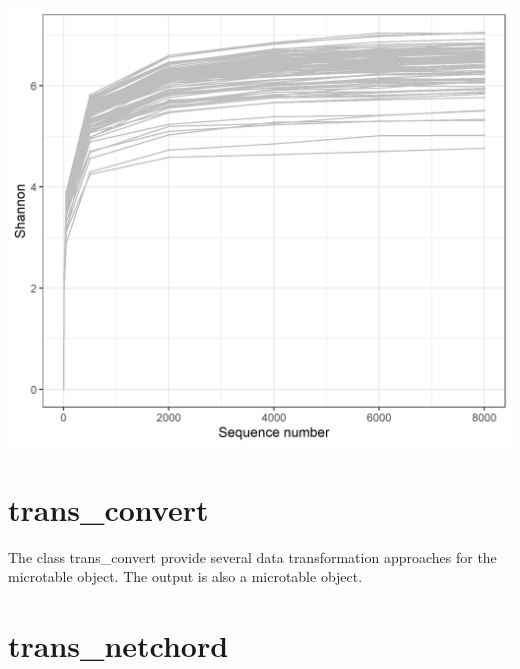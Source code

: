 \documentclass[
]{book}
\newenvironment{Shaded}{\begin{snugshade}}{\end{snugshade}}
\newcommand{\AttributeTok}[1]{\textcolor[rgb]{0.77,0.63,0.00}{#1}}
\newcommand{\CommentTok}[1]{\textcolor[rgb]{0.56,0.35,0.01}{\textit{#1}}}
\newcommand{\FunctionTok}[1]{\textcolor[rgb]{0.00,0.00,0.00}{#1}}
\newcommand{\NormalTok}[1]{#1}
\newcommand{\OtherTok}[1]{\textcolor[rgb]{0.56,0.35,0.01}{#1}}
\newcommand{\SpecialCharTok}[1]{\textcolor[rgb]{0.00,0.00,0.00}{#1}}
\newcommand{\StringTok}[1]{\textcolor[rgb]{0.31,0.60,0.02}{#1}}
\begin{document}
\begin{center}\includegraphics[width=550px]{Images/plot_trans_rarefy} \end{center}

\hypertarget{trans_convert}{%
\section{trans\_convert}\label{trans_convert}}

The class trans\_convert provide several data transformation approaches for the microtable object.
The output is also a microtable object.

\begin{Shaded}
\end{Shaded}

\hypertarget{trans_netchord}{%
\section{trans\_netchord}\label{trans_netchord}}
\end{document}
